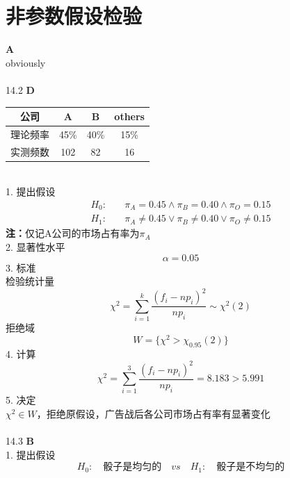 \documentclass[a4paper]{ctexart}    %
\begin{document}
	\section{非参数假设检验}
	 \quad \textbf{A} \\
	obviously \\ \\
	14.2 \quad \textbf{D}
	\begin{table}[!htbp]
		\centering
		\begin{tabular}{c|ccc}
			\hline
			公司 & A & B & others \\ \hline
			理论频率 & 45\% & 40\% & 15\% \\ \hline
			实测频数 & 102 & 82 & 16 \\ \hline
		\end{tabular}
	\end{table} \\
	1. 提出假设
	\begin{equation*}
		\begin{split}
			H_0:& \quad \pi_A = 0.45 \wedge \pi_B = 0.40 \wedge \pi_O = 0.15 \\
			H_1:& \quad \pi_A \neq 0.45 \vee \pi_B \neq 0.40 \vee \pi_O \neq 0.15
		\end{split}
	\end{equation*}
	\textbf{注：}仅记A公司的市场占有率为$ \pi_A $ \\
	2. 显著性水平
	\begin{equation*}
		\alpha = 0.05
	\end{equation*}
	3. 标准 \\
	检验统计量
	\begin{equation*}
		\chi^2 = \sum\limits_{i=1}^{k} \frac{(f_i - np_i)^2}{np_i} \sim \chi^2(2)
	\end{equation*}
	拒绝域 \\
	\begin{equation*}
		W = \{\chi^2 > \chi_{0.95}(2)\}
	\end{equation*}
	4. 计算
	\begin{equation*}
		\chi^2 = \sum\limits_{i=1}^{3} \frac{(f_i - np_i)^2}{np_i} = 8.183 > 5.991
	\end{equation*}
	5. 决定 \\
	$ \chi^2 \in W $，拒绝原假设，广告战后各公司市场占有率有显著变化  \\ \\
	14.3 \quad \textbf{B} \\
	1. 提出假设
	\begin{equation*}
		H_0: \quad \text{骰子是均匀的} \quad vs \quad H_1: \quad \text{骰子是不均匀的}
	\end{equation*}
\end{document}
